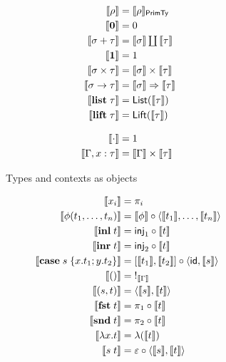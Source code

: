 \begin{figure}
\begin{subfigure}[t]{0.47\linewidth}
    \small
    \begin{align*}
    \llbracket \rho \rrbracket &= \llbracket \rho \rrbracket_{\mathsf{PrimTy}}
    \\
    \llbracket \mathbf{0} \rrbracket &= 0
    \\
    \llbracket \sigma + \tau \rrbracket &= \textstyle {\llbracket \sigma \rrbracket} \coprod {\llbracket \tau \rrbracket}
    \\
    \llbracket \mathbf{1} \rrbracket &= 1
    \\
    \llbracket \sigma \times \tau \rrbracket &= \llbracket \sigma \rrbracket \times \llbracket \tau \rrbracket
    \\
    \llbracket \sigma \to \tau \rrbracket &= \llbracket \sigma \rrbracket \Rightarrow \llbracket \tau \rrbracket
    \\
    \llbracket \mathbf{list}\;\tau \rrbracket &= \mathsf{List}(\llbracket \tau \rrbracket)
    \\
    \llbracket \mathbf{lift}\;\tau \rrbracket &= \mathsf{Lift}(\llbracket \tau \rrbracket)
    \\[3mm]
    \llbracket \cdot \rrbracket &= 1
    \\
    \llbracket \Gamma, x: \tau \rrbracket &= \llbracket \Gamma \rrbracket \times \llbracket \tau \rrbracket
    \end{align*}
  \caption{Types and contexts as objects}
  \label{fig:semantics:types}
\end{subfigure}
\begin{subfigure}{0.8\linewidth}
  \small
  \begin{align*}
  \sem{x_i} &= \pi_i
  \\
  \sem{\phi(t_1, \ldots, t_n)}
  &=
  \sem{\phi} \comp \prodM{\sem{t_1}}{\ldots, \sem{t_n}}
  \\
  \sem{\tmInl{t}} &= \mathsf{inj}_1 \comp \sem{t}
  \\
  \sem{\tmInr{t}} &= \mathsf{inj}_2 \comp \sem{t}
  \\
  \sem{\tmCase{s}{x}{t_1}{y}{t_2}} &= \coprodM{\sem{t_1}}{\sem{t_2}} \comp \prodM{\id}{\sem{s}}
  \\
  \sem{\tmUnit} &=\;!_{\sem{\Gamma}}
  \\
  \sem{\tmPair{s}{t}} &= \prodM{\sem{s}}{\sem{t}}
  \\
  \sem{\tmFst{t}} &= \pi_1 \comp \sem{t}
  \\
  \sem{\tmSnd{t}} &= \pi_2 \comp \sem{t}
  \\
  \sem{\tmFun{x}{t}} &= \lambda(\sem{t})
  \\
  \sem{\tmApp{s}{t}} &= \eval \comp \prodM{\sem{s}}{\sem{t}}

\end{align*}
\end{subfigure}
\end{figure}
